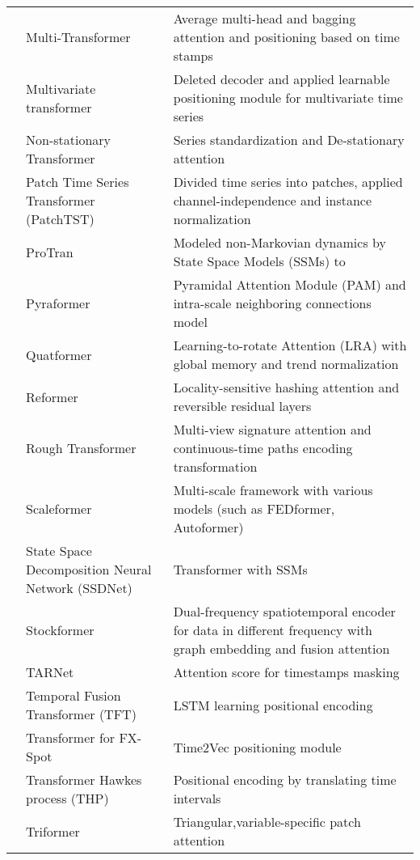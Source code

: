\documentclass[preprint,12pt]{elsarticle}
\begin{document}
\begin{table}
{\begin{tabular}{p{2.6cm} | p{4cm} p{7.5cm}}
\citet{ramos2021multi} & Multi-Transformer &  Average multi-head and bagging attention and positioning based on time stamps \\  
\citet{zerveas2021transformer} & Multivariate transformer & Deleted decoder and applied learnable positioning module for multivariate time series\\ 
\citet{liu2022nstrans} & Non-stationary Transformer &  Series standardization and De-stationary attention \\ 
\citet{nie2022PatchTST} & Patch Time Series Transformer (PatchTST) & Divided time series into patches, applied channel-independence and instance normalization \\ 
\citet{tang2021probabilistic} & ProTran &  Modeled non-Markovian dynamics by State Space Models (SSMs) to \\ 
\citet{Liu2022PyraformerLP} & Pyraformer & Pyramidal Attention Module (PAM) and intra-scale neighboring connections model \\ 
\citet{chen2022learning} & Quatformer & Learning-to-rotate Attention (LRA) with global memory and trend normalization\\ 
\citet{kitaev2019reformer} & Reformer & Locality-sensitive hashing attention and reversible residual layers \\ 
\citet{morenopino2024rough} & Rough Transformer & Multi-view signature attention and continuous-time paths encoding transformation\\
\citet{shabani2022scaleformer} & Scaleformer & Multi-scale framework with various models (such as FEDformer, Autoformer) \\ 
\citet{lin2021ssdnet} & State Space Decomposition Neural Network (SSDNet) &  Transformer
 with SSMs  \\ 
\citet{ma2025stockformer} & Stockformer & Dual-frequency spatiotemporal encoder for data in different frequency with graph embedding and fusion attention\\
\citet{chowdhury2022tarnet} & TARNet & Attention score for timestamps masking \\ 
\citet{olorunnimbe2024ensemble} & Temporal Fusion Transformer (TFT) & LSTM learning positional encoding \\ 
\citet{fischer2024fx} & Transformer for FX-Spot &  Time2Vec positioning module\\ 
\citet{zuo2020transformer} & Transformer Hawkes process (THP) &  Positional encoding by translating time intervals\\ 
\citet{cirstea2022triformer} & Triformer &  Triangular,variable-specific patch attention \\ 
\bottomrule
\end{tabular}
}
\end{table}
\end{document}
